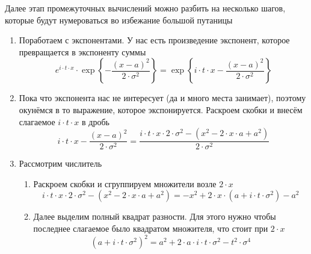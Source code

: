 Далее этап промежуточных вычислений можно разбить на несколько шагов,
которые будут нумероваться во избежание большой путаницы
\begin{enumerate}
    \item Поработаем с экспонентами. У нас есть произведение экспонент,
        которое превращается в экспоненту суммы
        $$e^{i \cdot t \cdot x}
                \cdot \exp{\left\{-\frac{\left( x-a \right)^2}
                    {2 \cdot \sigma^2} \right\}}
            = \exp{\left\{i \cdot t \cdot x - \frac{\left( x-a \right)^2}
                {2 \cdot \sigma^2} \right\}}$$

    \item Пока что экспонента нас не интересует (да и много места занимает),
        поэтому окунёмся в то выражение, которое экспонируется.
        Раскроем скобки и внесём слагаемое $i \cdot t \cdot x$ в дробь
        $$i \cdot t \cdot x -
                    \frac{\left( x-a \right)^2}{2 \cdot \sigma^2}
                = \frac{i \cdot t \cdot x \cdot 2 \cdot \sigma^2
                    - \left( x^2 - 2 \cdot x \cdot a + a^2 \right)}
                    {2 \cdot \sigma^2}$$

    \item Рассмотрим числитель
        \begin{enumerate}
            \item Раскроем скобки и сгруппируем множители возле $2 \cdot x$
                $$i \cdot t \cdot x \cdot 2 \cdot \sigma^2
                        - \left( x^2 - 2 \cdot x \cdot a + a^2 \right)
                    = - x^2 + 2 \cdot x \cdot \left( a
                        + i \cdot t \cdot \sigma^2 \right) - a^2$$
            \item Далее выделим полный квадрат разности.
                Для этого нужно чтобы последнее слагаемое было квадратом
                множителя, что стоит при $2 \cdot x$
                $$\left( a + i \cdot t \cdot \sigma^2 \right)^2
                    = a^2 + 2 \cdot a \cdot i \cdot t \cdot \sigma^2
                        - t^2 \cdot \sigma^4$$


\end{enumerate}
\end{enumerate}
